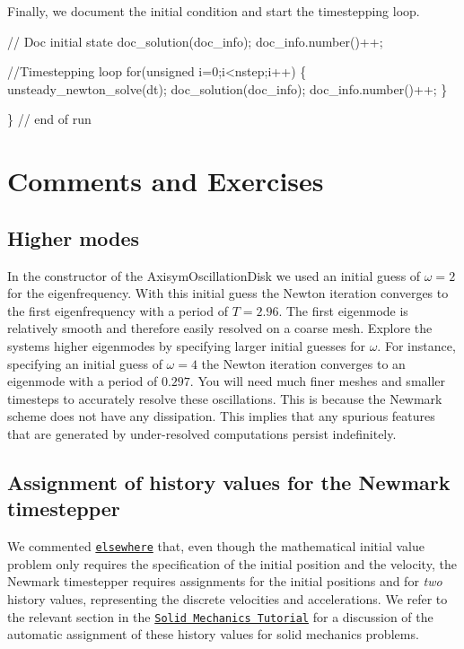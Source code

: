 Finally, we document the initial condition and start the timestepping loop.


\begin{DoxyCodeInclude}

 \textcolor{comment}{// Doc initial state}
 doc\_solution(doc\_info);
 doc\_info.number()++;

 \textcolor{comment}{//Timestepping loop}
 \textcolor{keywordflow}{for}(\textcolor{keywordtype}{unsigned} i=0;i<nstep;i++)
  \{
   unsteady\_newton\_solve(dt);
   doc\_solution(doc\_info);
   doc\_info.number()++;
  \}

\} \textcolor{comment}{// end of run}

\end{DoxyCodeInclude}




 

\hypertarget{index_comex}{}\section{Comments and Exercises}\label{index_comex}
\hypertarget{index_higher_modes}{}\subsection{Higher modes}\label{index_higher_modes}
In the constructor of the {\ttfamily Axisym\+Oscillation\+Disk} we used an initial guess of $ \omega=2 $ for the eigenfrequency. With this initial guess the Newton iteration converges to the first eigenfrequency with a period of $ T=2.96. $ The first eigenmode is relatively smooth and therefore easily resolved on a coarse mesh. Explore the system\textquotesingle{}s higher eigenmodes by specifying larger initial guesses for $ \omega $. For instance, specifying an initial guess of $ \omega=4 $ the Newton iteration converges to an eigenmode with a period of $ 0.297. $ You will need much finer meshes and smaller timesteps to accurately resolve these oscillations. This is because the Newmark scheme does not have any dissipation. This implies that any spurious features that are generated by under-\/resolved computations persist indefinitely.\hypertarget{index_newmark_ic}{}\subsection{Assignment of history values for the Newmark timestepper}\label{index_newmark_ic}
We commented \href{../../../linear_wave/two_d_linear_wave/html/index.html#IC}{\tt elsewhere} that, even though the mathematical initial value problem only requires the specification of the initial position and the velocity, the Newmark timestepper requires assignments for the initial positions and for {\itshape two} history values, representing the discrete velocities and accelerations. We refer to the relevant section in the \href{../../../solid/solid_theory/html/index.html#Solid_IC}{\tt Solid Mechanics Tutorial} for a discussion of the automatic assignment of these history values for solid mechanics problems.

